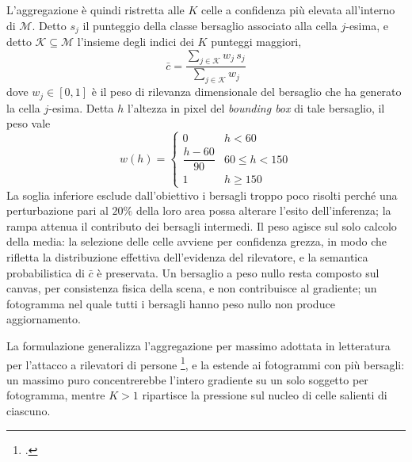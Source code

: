 \documentclass[a4paper,12pt]{report}
\begin{document}
L'aggregazione è quindi ristretta alle $K$ celle a confidenza più elevata
all'interno di $\mathcal{M}$. Detto $s_j$ il punteggio della classe bersaglio
associato alla cella $j$-esima, e detto $\mathcal{K} \subseteq \mathcal{M}$
l'insieme degli indici dei $K$ punteggi maggiori,
\begin{equation}
    \bar{c} = \frac{\sum_{j \in \mathcal{K}} w_j \, s_j}{\sum_{j \in \mathcal{K}} w_j}
    \label{eq:topk}
\end{equation}
dove $w_j \in [0,1]$ è il peso di rilevanza dimensionale del bersaglio che ha
generato la cella $j$-esima. Detta $h$ l'altezza in pixel del \textit{bounding
box} di tale bersaglio, il peso vale
\begin{equation}
    w(h) =
    \begin{cases}
        0 & h < 60 \\[2pt]
        \dfrac{h - 60}{90} & 60 \leq h < 150 \\[6pt]
        1 & h \geq 150
    \end{cases}
    \label{eq:peso_tattico}
\end{equation}
La soglia inferiore esclude dall'obiettivo i bersagli troppo poco risolti perché
una perturbazione pari al $20\%$ della loro area possa alterare l'esito
dell'inferenza; la rampa attenua il contributo dei bersagli intermedi. Il peso
agisce sul solo calcolo della media: la selezione delle celle avviene per
confidenza grezza, in modo che rifletta la distribuzione effettiva dell'evidenza
del rilevatore, e la semantica probabilistica di $\bar{c}$ è preservata. Un
bersaglio a peso nullo resta composto sul canvas, per consistenza fisica della
scena, e non contribuisce al gradiente; un fotogramma nel quale tutti i bersagli
hanno peso nullo non produce aggiornamento.

La formulazione generalizza l'aggregazione per massimo adottata in letteratura
per l'attacco a rilevatori di persone \footcite{thys_2019}, e la estende ai
fotogrammi con più bersagli: un massimo puro concentrerebbe l'intero gradiente
su un solo soggetto per fotogramma, mentre $K > 1$ ripartisce la pressione sul
nucleo di celle salienti di ciascuno.
\end{document}
